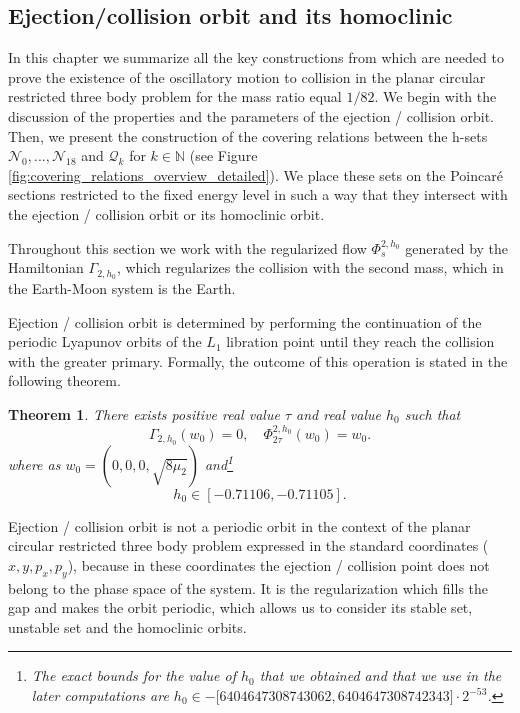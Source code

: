 \documentclass[1p]{article}
\newtheorem{theorem}{Theorem}
\begin{document}
\subsection{Ejection/collision orbit and its homoclinic}
\label{subsec:EC_orbit_and_homoclinic}
In this chapter we summarize all the key constructions from \cite{CAPINSKI2026109173} which are needed to prove the existence of the oscillatory motion to collision in the planar circular restricted three body problem for the mass ratio equal $1/82$. We begin with the discussion of the properties and the parameters of the ejection / collision orbit. Then, we present the construction of the covering relations between the h-sets $\mathcal{N}_0, ..., \mathcal{N}_{18}$ and $\mathcal{Q}_k$ for $k \in \mathbb{N}$ (see Figure \ref{fig:covering_relations_overview_detailed}). We place these sets on the Poincar\'e sections restricted to the fixed energy level in such a way that they intersect with the ejection / collision orbit or its homoclinic orbit.

Throughout this section we work with the regularized flow $\Phi_{s}^{2,h_{0}}$ generated by the Hamiltonian $\Gamma_{2,h_{0}}$, which regularizes the collision with the second mass, which in the Earth-Moon system is the Earth.

Ejection / collision orbit is determined by performing the continuation of the periodic Lyapunov orbits of the $L_1$ libration point until they reach the collision with the greater primary. Formally, the outcome of this operation is stated in the following theorem.

\begin{theorem}
    \label{thm:lyapunov_orbit_energy}
    \cite{CAPINSKI2026109173} 
    There exists positive real value $\tau$ and real value $h_{0}$ such that
    \[
        \Gamma_{2,h_{0}}(w_{0})=0,\quad\Phi_{2\tau}^{2,h_{0}}(w_{0})=w_{0}.
    \]
    where as $w_{0}=(0,0,0,\sqrt{8\mu_{2}})$ and\footnote{The exact bounds for the value of $h_0$ that we obtained and that we use in the later computations are $h_{0}\in-\big[6404647308743062,6404647308742343\big]\cdot2^{-53}$.}
    \begin{equation}
        \label{eq:h0_energy_interval}
        h_0 \in [ -0.71106, -0.71105 ].
    \end{equation}
\end{theorem}

Ejection / collision orbit is not a periodic orbit in the context of the planar circular restricted three body problem expressed in the standard coordinates ($x, y, p_x, p_y$), because in these coordinates the ejection / collision point does not belong to the phase space of the system. It is the regularization which fills the gap and makes the orbit periodic, which allows us to consider its stable set, unstable set and the homoclinic orbits.
\end{document}
